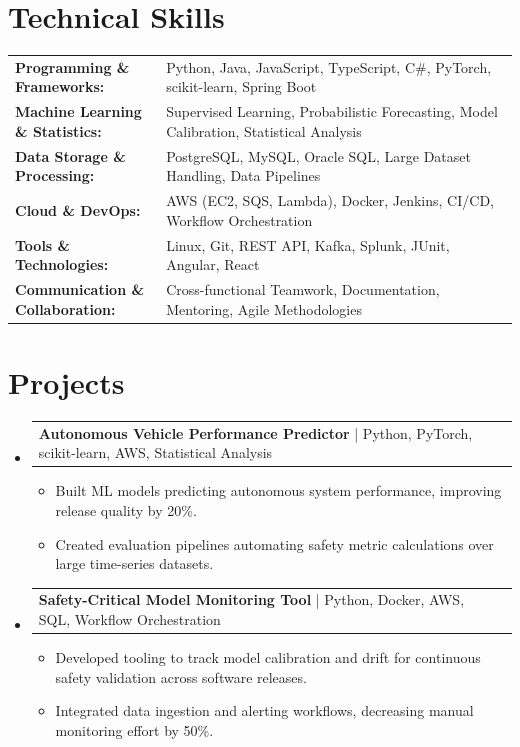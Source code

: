 \documentclass[letterpaper,10pt]{article}
\makeatletter
\newcommand{\resumeItem}[1]{
  \item{\fontsize{8pt}{9pt}\selectfont
    #1 \vspace{-3pt}
  }
}
\newcommand{\resumeProjectHeading}[2]{
    \item
    \begin{tabular*}{1.001\textwidth}{l@{\extracolsep{\fill}}r}
      \fontsize{8.5pt}{10pt}#1 & \textbf{\fontsize{8.5pt}{10pt} #2}\\
    \end{tabular*}\vspace{-7pt}
}
\newcommand{\resumeSubHeadingListStart}{\begin{itemize}[leftmargin=0pt, label={}]}
\newcommand{\resumeSubHeadingListEnd}{\end{itemize}}
\newcommand{\resumeItemListStart}{\begin{itemize}[leftmargin=*]}
\newcommand{\resumeItemListEnd}{\end{itemize}\vspace{-5pt}}
\makeatother
\begin{document}
\section{Technical Skills}
        \vspace{-14pt}
        \begin{table}[h]
            \fontsize{8pt}{9pt}\selectfont
            \begin{tabular}{p{0.3\linewidth} p{0.7\linewidth}}
                \textbf{Programming \& Frameworks:} & Python, Java, JavaScript, TypeScript, C\#, PyTorch, scikit-learn, Spring Boot \\
                \textbf{Machine Learning \& Statistics:} & Supervised Learning, Probabilistic Forecasting, Model Calibration, Statistical Analysis \\
                \textbf{Data Storage \& Processing:} & PostgreSQL, MySQL, Oracle SQL, Large Dataset Handling, Data Pipelines \\
                \textbf{Cloud \& DevOps:} & AWS (EC2, SQS, Lambda), Docker, Jenkins, CI/CD, Workflow Orchestration \\
                \textbf{Tools \& Technologies:} & Linux, Git, REST API, Kafka, Splunk, JUnit, Angular, React \\
                \textbf{Communication \& Collaboration:} & Cross-functional Teamwork, Documentation, Mentoring, Agile Methodologies \\
            \end{tabular}
        \end{table}
 \vspace{-18pt}

\section{Projects}
    \vspace{-5pt}
    \resumeSubHeadingListStart
          \resumeProjectHeading
            {\textbf{Autonomous Vehicle Performance Predictor} | Python, PyTorch, scikit-learn, AWS, Statistical Analysis}{}
            \resumeItemListStart
                \resumeItem{Built ML models predicting autonomous system performance, improving release quality by 20\%.}
                \resumeItem{Created evaluation pipelines automating safety metric calculations over large time-series datasets.}
            \resumeItemListEnd
        \vspace{-12pt}
    
        \resumeProjectHeading
            {\textbf{Safety-Critical Model Monitoring Tool} | Python, Docker, AWS, SQL, Workflow Orchestration}{}
        \resumeItemListStart
                \resumeItem{Developed tooling to track model calibration and drift for continuous safety validation across software releases.}
                \resumeItem{Integrated data ingestion and alerting workflows, decreasing manual monitoring effort by 50\%.}
        \resumeItemListEnd
      \vspace{-12pt}
    \resumeSubHeadingListEnd
\end{document}
